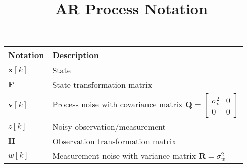 \documentclass[11pt]{article}
\renewcommand{\vec}[1]{\ensuremath{\boldsymbol{#1}}}
\begin{document}
\title{AR Process Notation}
\author{}
\date{}
\maketitle



\begin{tabular}{ |p{2cm}||p{10cm}|  }
\hline
Notation       & Description \\
\hline
$\vec{x}[k]$   & State                        \\  
\hline
$\vec{F}$      & State transformation matrix   \\  
\hline
$\vec{v}[k]$   & Process noise with covariance matrix  $\vec{Q}=\begin{bmatrix}
    \sigma_v^2       & 0 \\
    0       & 0 
\end{bmatrix}$   \\  
\hline
$z[k]$         & Noisy observation/measurement   \\
\hline
$\vec{H}$      & Observation transformation matrix   \\
\hline
$w[k]$         & Measurement noise with variance matrix $\vec{R}=\sigma_w^2$    \\
\hline
\end{tabular}
\end{document}

